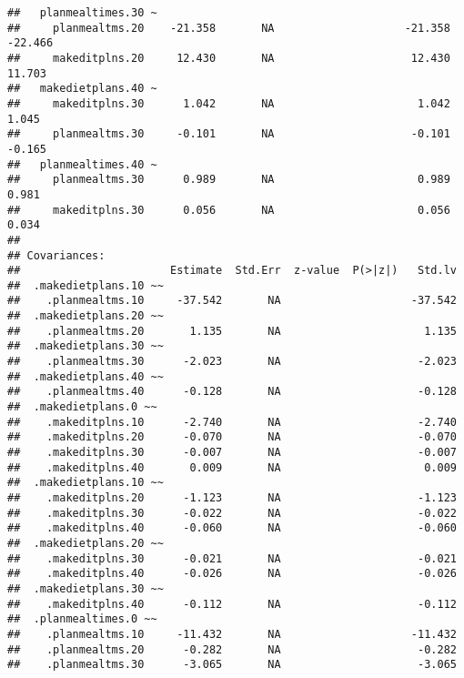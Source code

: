 \documentclass{article}\usepackage[]{graphicx}\usepackage[]{color}
\makeatletter
\newenvironment{kframe}{%
 \def\at@end@of@kframe{}%
 \ifinner\ifhmode%
  \def\at@end@of@kframe{\end{minipage}}%
  \begin{minipage}{\columnwidth}%
 \fi\fi%
 \def\FrameCommand##1{\hskip\@totalleftmargin \hskip-\fboxsep
 \colorbox{shadecolor}{##1}\hskip-\fboxsep
     \hskip-\linewidth \hskip-\@totalleftmargin \hskip\columnwidth}%
 \MakeFramed {\advance\hsize-\width
   \@totalleftmargin\z@ \linewidth\hsize
   \@setminipage}}%
 {\par\unskip\endMakeFramed%
 \at@end@of@kframe}
\newenvironment{knitrout}{}{} %
\makeatother
\begin{document}
\begin{knitrout}
\begin{kframe}
\begin{verbatim}
##   planmealtimes.30 ~                                                      
##     planmealtms.20    -21.358       NA                    -21.358  -22.466
##     makeditplns.20     12.430       NA                     12.430   11.703
##   makedietplans.40 ~                                                      
##     makeditplns.30      1.042       NA                      1.042    1.045
##     planmealtms.30     -0.101       NA                     -0.101   -0.165
##   planmealtimes.40 ~                                                      
##     planmealtms.30      0.989       NA                      0.989    0.981
##     makeditplns.30      0.056       NA                      0.056    0.034
## 
## Covariances:
##                       Estimate  Std.Err  z-value  P(>|z|)   Std.lv
##  .makedietplans.10 ~~                                             
##    .planmealtms.10     -37.542       NA                    -37.542
##  .makedietplans.20 ~~                                             
##    .planmealtms.20       1.135       NA                      1.135
##  .makedietplans.30 ~~                                             
##    .planmealtms.30      -2.023       NA                     -2.023
##  .makedietplans.40 ~~                                             
##    .planmealtms.40      -0.128       NA                     -0.128
##  .makedietplans.0 ~~                                              
##    .makeditplns.10      -2.740       NA                     -2.740
##    .makeditplns.20      -0.070       NA                     -0.070
##    .makeditplns.30      -0.007       NA                     -0.007
##    .makeditplns.40       0.009       NA                      0.009
##  .makedietplans.10 ~~                                             
##    .makeditplns.20      -1.123       NA                     -1.123
##    .makeditplns.30      -0.022       NA                     -0.022
##    .makeditplns.40      -0.060       NA                     -0.060
##  .makedietplans.20 ~~                                             
##    .makeditplns.30      -0.021       NA                     -0.021
##    .makeditplns.40      -0.026       NA                     -0.026
##  .makedietplans.30 ~~                                             
##    .makeditplns.40      -0.112       NA                     -0.112
##  .planmealtimes.0 ~~                                              
##    .planmealtms.10     -11.432       NA                    -11.432
##    .planmealtms.20      -0.282       NA                     -0.282
##    .planmealtms.30      -3.065       NA                     -3.065

\end{verbatim}
\end{kframe}
\end{knitrout}
\end{document}
